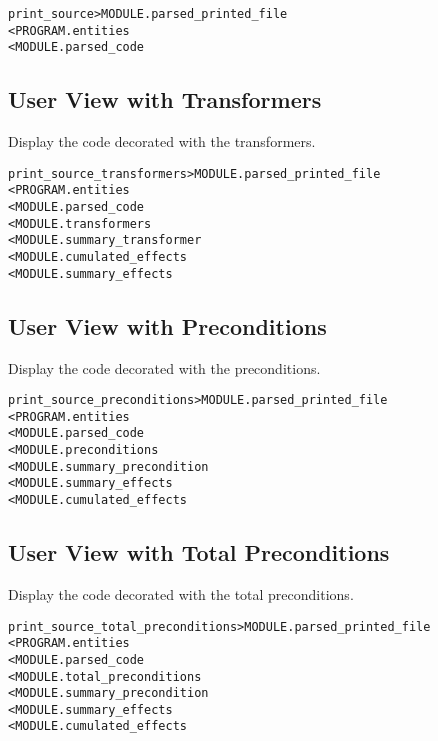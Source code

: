 \documentclass[a4paper]{report}
\newenvironment{PipsMake}{\begin{alltt}}{\end{alltt}}
\newenvironment{PipsPass}[1]{\label{pass:#1}}{}
\begin{document}
\begin{PipsMake}
print_source         > MODULE.parsed_printed_file
        < PROGRAM.entities
        < MODULE.parsed_code
\end{PipsMake}

\subsection{User View with Transformers}

\begin{PipsPass}{print_source_transformers}
Display the code decorated with the transformers.
\end{PipsPass}

\begin{PipsMake}
print_source_transformers         > MODULE.parsed_printed_file
        < PROGRAM.entities
        < MODULE.parsed_code
        < MODULE.transformers
        < MODULE.summary_transformer
        < MODULE.cumulated_effects
        < MODULE.summary_effects
\end{PipsMake}

\subsection{User View with Preconditions}

\begin{PipsPass}{print_source_preconditions}
Display the code decorated with the preconditions.
\end{PipsPass}

\begin{PipsMake}
print_source_preconditions        > MODULE.parsed_printed_file
        < PROGRAM.entities
        < MODULE.parsed_code
        < MODULE.preconditions
        < MODULE.summary_precondition
        < MODULE.summary_effects
        < MODULE.cumulated_effects
\end{PipsMake}

\subsection{User View with Total Preconditions}

\begin{PipsPass}{print_source_total_preconditions}
Display the code decorated with the total preconditions.
\end{PipsPass}

\begin{PipsMake}
print_source_total_preconditions        > MODULE.parsed_printed_file
        < PROGRAM.entities
        < MODULE.parsed_code
        < MODULE.total_preconditions
        < MODULE.summary_precondition
        < MODULE.summary_effects
        < MODULE.cumulated_effects
\end{PipsMake}
\end{document}
